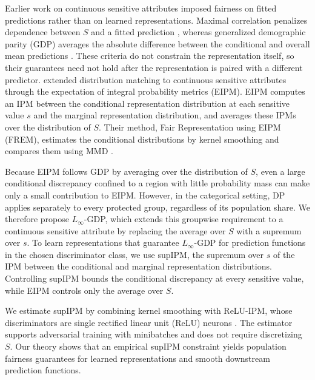 \documentclass{article} %
\begin{document}
Earlier work on continuous sensitive attributes imposed fairness on fitted predictions rather than on learned representations.  Maximal correlation penalizes dependence between $S$ and a fitted prediction \citep{mary2019continuous,grari2020continuous}, whereas generalized demographic parity (GDP) averages the absolute difference between the conditional and overall mean predictions \citep{jiang2022gdp}.  These criteria do not constrain the representation itself, so their guarantees need not hold after the representation is paired with a different predictor.  \citet{kong2025fair} extended distribution matching to continuous sensitive attributes through the expectation of integral probability metrics (EIPM).  EIPM computes an IPM between the conditional representation distribution at each sensitive value $s$ and the marginal representation distribution, and averages these IPMs over the distribution of $S$.  Their method, Fair Representation using EIPM (FREM), estimates the conditional distributions by kernel smoothing and compares them using MMD \citep{gretton2012kernel}.

Because EIPM follows GDP by averaging over the distribution of $S$, even a large conditional discrepancy confined to a region with little probability mass can make only a small contribution to EIPM.  However, in the categorical setting, DP applies separately to every protected group, regardless of its population share.  We therefore propose $L_{\infty}$-GDP, which extends this groupwise requirement to a continuous sensitive attribute by replacing the average over $S$ with a supremum over $s$.  To learn representations that guarantee $L_{\infty}$-GDP for prediction functions in the chosen discriminator class, we use supIPM, the supremum over $s$ of the IPM between the conditional and marginal representation distributions.  Controlling supIPM bounds the conditional discrepancy at every sensitive value, while EIPM controls only the average over $S$.

We estimate supIPM by combining kernel smoothing with ReLU-IPM, whose discriminators are single rectified linear unit (ReLU) neurons \citep{park2025relu}.  The estimator supports adversarial training with minibatches and does not require discretizing $S$.  Our theory shows that an empirical supIPM constraint yields population fairness guarantees for learned representations and smooth downstream prediction functions.
\end{document}
